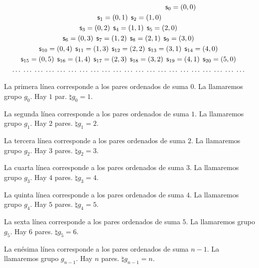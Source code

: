 \documentclass{amsart}
\theoremstyle{definition}
\theoremstyle{remark}
\numberwithin{equation}{section}
\newcommand{\numeral}{\natural}
\begin{document}
\begin{multline*}
  \quad \qquad \qquad \qquad \qquad \qquad \qquad \qquad \textsf{s}_{0} =
  \left({{0},{0}}\right) \; \\
  \textsf{s}_{1} = \left({{0},{1}}\right) \;  \textsf{s}_{2} = \left({{1},{0}}\right)  \\
  \textsf{s}_{3} = \left({{0},{2}}\right) \;  \textsf{s}_{4} = \left({{1},{1}}\right)  \;
  \textsf{s}_{5} = \left({{2},{0}}\right) \;\\
  \textsf{s}_{6} = \left({{0},{3}}\right) \;  \textsf{s}_{7} = \left({{1},{2}}\right)  \;
  \textsf{s}_{8} = \left({{2},{1}}\right) \;  \textsf{s}_{9} = \left({{3},{0}}\right)  \;
  \\
  \textsf{s}_{10} = \left({{0},{4}}\right) \;  \textsf{s}_{11} = \left({{1},{3}}\right)  \;
  \textsf{s}_{12} = \left({{2},{2}}\right) \;  \textsf{s}_{13} = \left({{3},{1}}\right)  \;
  \textsf{s}_{14} = \left({{4},{0}}\right) \;
  \\
  \textsf{s}_{15} = \left({{0},{5}}\right) \;  \textsf{s}_{16} = \left({{1},{4}}\right)  \;
  \textsf{s}_{17} = \left({{2},{3}}\right) \;  \textsf{s}_{18} = \left({{3},{2}}\right)  \;
  \textsf{s}_{19} = \left({{4},{1}}\right) \;  \textsf{s}_{20} = \left({{5},{0}}\right)  \;
  \\
  \ldots \;  \ldots  \;  \ldots \;  \ldots  \;  \ldots \;  \ldots \; \ldots
  \; \ldots \;  \ldots  \;  \ldots \;  \ldots  \;  \ldots \;  \ldots \;
  \ldots \; \ldots \;  \ldots  \;  \ldots \;  \ldots  \;  \ldots \;  \ldots
  \; \ldots \;
\end{multline*}


	La primera línea corresponde a los pares ordenados de suma $0$. La
llamaremos grupo $g_0$. Hay $1$ par. $\numeral g_0 = 1$.


	La segunda línea corresponde a los pares ordenados de suma $1$. La
llamaremos grupo $g_1$. Hay $2$ pares. $\numeral g_1 = 2$.


	La tercera línea corresponde a los pares ordenados de suma $2$. La
llamaremos grupo $g_2$. Hay $3$ pares. $\numeral g_2 = 3$.


	La cuarta línea corresponde a los pares ordenados de suma $3$. La
llamaremos grupo $g_3$. Hay $4$ pares. $\numeral g_3 = 4$.


	La quinta línea corresponde a los pares ordenados de suma $4$. La
llamaremos grupo $g_4$. Hay $5$ pares. $\numeral g_4 = 5$.


	La sexta línea corresponde a los pares ordenados de suma $5$. La
llamaremos grupo $g_5$. Hay $6$ pares. $\numeral g_5 = 6$.


	La enésima línea corresponde a los pares ordenados de suma $n-1$. La
llamaremos grupo $g_{n-1}$. Hay $n$ pares. $\numeral g_{n-1} = n$.
\end{document}
